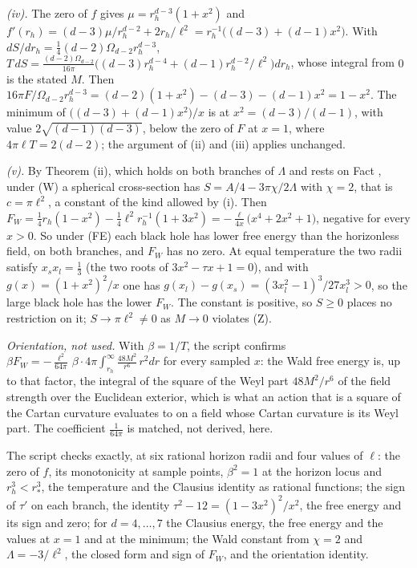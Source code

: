 \emph{(iv).} The zero of $f$ gives $\mu = r_{h}^{d-3}(1 + x^{2})$ and $f'(r_{h}) = (d-3)\mu/r_{h}^{d-2} + 2r_{h}/\ell^{2} = r_{h}^{-1}\bigl((d-3) + (d-1)x^{2}\bigr)$. With $dS/dr_{h} = \tfrac14(d-2)\Omega_{d-2}r_{h}^{d-3}$, $T\,dS = \tfrac{(d-2)\Omega_{d-2}}{16\pi}\bigl((d-3)r_{h}^{d-4} + (d-1)r_{h}^{d-2}/\ell^{2}\bigr)dr_{h}$, whose integral from $0$ is the stated $M$. Then $16\pi F/\Omega_{d-2}r_{h}^{d-3} = (d-2)(1 + x^{2}) - (d-3) - (d-1)x^{2} = 1 - x^{2}$. The minimum of $\bigl((d-3) + (d-1)x^{2}\bigr)/x$ is at $x^{2} = (d-3)/(d-1)$, with value $2\sqrt{(d-1)(d-3)}$, below the zero of $F$ at $x = 1$, where $4\pi\ell T = 2(d-2)$; the argument of (ii) and (iii) applies unchanged.

\emph{(v).} By Theorem (ii), which holds on both branches of $\Lambda$ and rests on Fact , under (W) a spherical cross-section has $S = A/4 - 3\pi\chi/2\Lambda$ with $\chi = 2$, that is $c = \pi\ell^{2}$, a constant of the kind allowed by (i). Then $F_{W} = \tfrac14 r_{h}(1 - x^{2}) - \tfrac14\ell^{2}r_{h}^{-1}(1 + 3x^{2}) = -\tfrac{\ell}{4x}\bigl(x^{4} + 2x^{2} + 1\bigr)$, negative for every $x > 0$. So under (FE) each black hole has lower free energy than the horizonless field, on both branches, and $F_{W}$ has no zero. At equal temperature the two radii satisfy $x_{s}x_{l} = \tfrac13$ (the two roots of $3x^{2} - \tau x + 1 = 0$), and with $g(x) = (1 + x^{2})^{2}/x$ one has $g(x_{l}) - g(x_{s}) = (3x_{l}^{2} - 1)^{3}/27x_{l}^{3} > 0$, so the large black hole has the lower $F_{W}$. The constant is positive, so $S \ge 0$ places no restriction on it; $S \to \pi\ell^{2} \ne 0$ as $M \to 0$ violates (Z).

\emph{Orientation, not used.} With $\beta = 1/T$, the script confirms $\beta F_{W} = -\tfrac{\ell^{2}}{64\pi}\,\beta\cdot 4\pi\!\int_{r_{h}}^{\infty}\!\tfrac{48M^{2}}{r^{6}}\,r^{2}dr$ for every sampled $x$: the Wald free energy is, up to that factor, the integral of the square of the Weyl part $48M^{2}/r^{6}$ of the field strength over the Euclidean exterior, which is what an action that is a square of the Cartan curvature evaluates to on a field whose Cartan curvature is its Weyl part. The coefficient $\tfrac{1}{64\pi}$ is matched, not derived, here.

The script checks exactly, at six rational horizon radii and four values of $\ell$: the zero of $f$, its monotonicity at sample points, $\beta^{2} = 1$ at the horizon locus and $r_{h}^{3} < r_{*}^{3}$, the temperature and the Clausius identity as rational functions; the sign of $\tau'$ on each branch, the identity $\tau^{2} - 12 = (1 - 3x^{2})^{2}/x^{2}$, the free energy and its sign and zero; for $d = 4, \dots, 7$ the Clausius energy, the free energy and the values at $x = 1$ and at the minimum; the Wald constant from $\chi = 2$ and $\Lambda = -3/\ell^{2}$, the closed form and sign of $F_{W}$, and the orientation identity.
